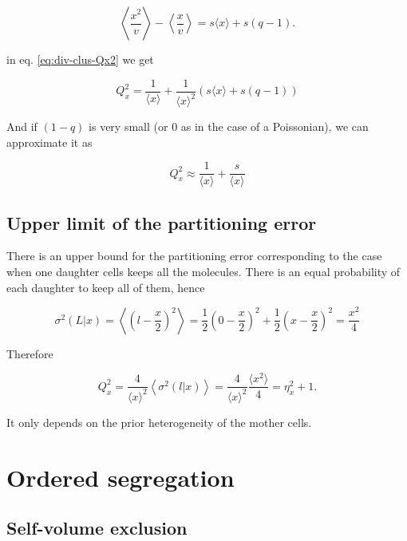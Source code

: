 \begin{equation}
  \left\langle \frac{x^2}{v}\right\rangle-\left\langle \frac{x}{v}\right\rangle = s\langle x\rangle+s(q-1).
\end{equation}

 in eq. \eqref{eq:div-clus-Qx2} we get

\begin{equation}
  Q_x^2 = \frac{1}{\langle x\rangle} + \frac{1}{\langle x\rangle^2}\left(s\langle x\rangle+s(q-1)\right)
\end{equation}

And if $(1-q)$ is very small (or $0$ as in the case of a Poissonian), we can approximate it as

\begin{equation}
  Q_x^2 \approx \frac{1}{\langle x\rangle} + \frac{s}{\langle x\rangle}
\end{equation}

\subsection{Upper limit of the partitioning error}

There is an upper bound for the partitioning error corresponding to the case when one daughter cells keeps all the molecules. There is an equal probability of each daughter to keep all of them, hence

\begin{equation}
  \sigma^2(L|x) = \left\langle\left(l-\frac{x}{2}\right)^2\right\rangle = \frac{1}{2}\left(0-\frac{x}{2}\right)^2+\frac{1}{2}\left(x-\frac{x}{2}\right)^2 = \frac{x^2}{4}
\end{equation}

Therefore

\begin{equation}
  Q_x^2 = \frac{4}{\langle x\rangle^2}\left\langle\sigma^2(l|x)\right\rangle = \frac{4}{\langle x\rangle^2}\frac{\langle x^2\rangle}{4} = \eta_x^2+1.
\end{equation}

It only depends on the prior heterogeneity of the mother cells.

\section{Ordered segregation}

\subsection{Self-volume exclusion}

